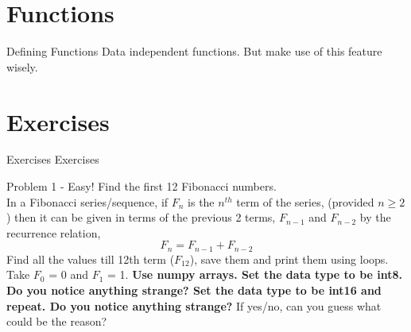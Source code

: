 \documentclass[10pt]{beamer}
\begin{document}
\section{Functions}

\begin{frame}[fragile]{Defining Functions}
Data independent functions. But make use of this feature wisely.
\end{frame}

\section{Exercises}
\begin{frame}{Exercises}
\centering
Exercises
\end{frame}

\begin{frame}{Problem 1 - Easy!}
Find the first 12 Fibonacci numbers. \\ In a Fibonacci series/sequence, if $F_n$ is the $n^{th}$ term of the series, (provided $n \ge 2$) then it can be given in terms of the previous 2 terms, $F_{n-1}$ and $F_{n-2}$ by the recurrence relation,
$$ F_n = F_{n-1} + F_{n-2}$$
Find all the values till 12th term ($F_{12}$), save them and print them using loops. Take $F_0$ = 0 and $F_1$ = 1. \textbf{Use numpy arrays. Set the data type to be int8. Do you notice anything strange? Set the data type to be int16 and repeat. Do you notice anything strange?} If yes/no, can you guess what could be the reason?
\end{frame}
\end{document}

